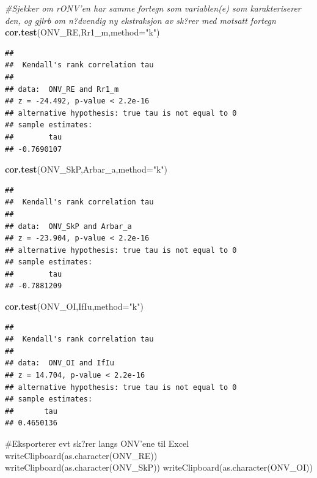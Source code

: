 \documentclass[]{article}
\newenvironment{Shaded}{\begin{snugshade}}{\end{snugshade}}
\newcommand{\CommentTok}[1]{\textcolor[rgb]{0.56,0.35,0.01}{\textit{#1}}}
\newcommand{\DataTypeTok}[1]{\textcolor[rgb]{0.13,0.29,0.53}{#1}}
\newcommand{\KeywordTok}[1]{\textcolor[rgb]{0.13,0.29,0.53}{\textbf{#1}}}
\newcommand{\NormalTok}[1]{#1}
\newcommand{\StringTok}[1]{\textcolor[rgb]{0.31,0.60,0.02}{#1}}
\begin{document}
\begin{Shaded}
\begin{Highlighting}[]
\CommentTok{#Sjekker om rONV'en har samme fortegn som variablen(e) som karakteriserer den, og gjlrb om n?dvendig ny ekstraksjon av sk?rer med motsatt fortegn}
\KeywordTok{cor.test}\NormalTok{(ONV_RE,Rr1_m,}\DataTypeTok{method=}\StringTok{"k"}\NormalTok{)}
\end{Highlighting}
\end{Shaded}

\begin{verbatim}
## 
##  Kendall's rank correlation tau
## 
## data:  ONV_RE and Rr1_m
## z = -24.492, p-value < 2.2e-16
## alternative hypothesis: true tau is not equal to 0
## sample estimates:
##        tau 
## -0.7690107
\end{verbatim}

\begin{Shaded}
\begin{Highlighting}[]
\KeywordTok{cor.test}\NormalTok{(ONV_SkP,Arbar_a,}\DataTypeTok{method=}\StringTok{"k"}\NormalTok{)}
\end{Highlighting}
\end{Shaded}

\begin{verbatim}
## 
##  Kendall's rank correlation tau
## 
## data:  ONV_SkP and Arbar_a
## z = -23.904, p-value < 2.2e-16
## alternative hypothesis: true tau is not equal to 0
## sample estimates:
##        tau 
## -0.7881209
\end{verbatim}

\begin{Shaded}
\begin{Highlighting}[]
\KeywordTok{cor.test}\NormalTok{(ONV_OI,IfIu,}\DataTypeTok{method=}\StringTok{"k"}\NormalTok{)}
\end{Highlighting}
\end{Shaded}

\begin{verbatim}
## 
##  Kendall's rank correlation tau
## 
## data:  ONV_OI and IfIu
## z = 14.704, p-value < 2.2e-16
## alternative hypothesis: true tau is not equal to 0
## sample estimates:
##       tau 
## 0.4650136
\end{verbatim}

\#Eksporterer evt sk?rer langs ONV'ene til Excel
writeClipboard(as.character(ONV\_RE))
writeClipboard(as.character(ONV\_SkP))
writeClipboard(as.character(ONV\_OI))
\end{document}
